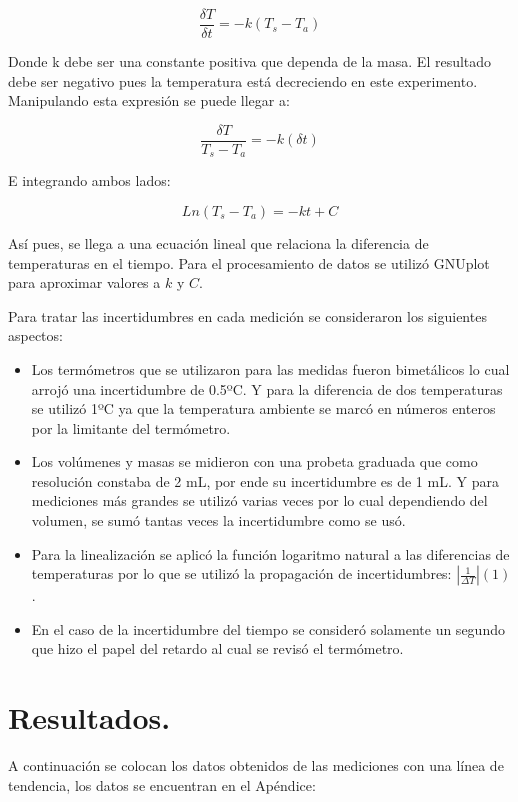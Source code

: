 \documentclass[a4paper]{article}
\begin{document}
$$ \frac{\delta T}{\delta t} = -k(T_{s}-T_{a})$$

Donde k debe ser una constante positiva que dependa de la masa. El resultado debe ser negativo pues la temperatura está decreciendo en este experimento.
Manipulando esta expresión se puede llegar a:

$$\frac{\delta T}{T_{s}-T_{a}}= -k(\delta t)$$

E integrando ambos lados:

$$ Ln(T_{s}-T_{a})=-kt+C $$

Así pues, se llega a una ecuación lineal que relaciona la diferencia de temperaturas en el tiempo. Para el procesamiento de datos se utilizó GNUplot para aproximar valores a $k$ y $C$. 

Para tratar las incertidumbres en cada medición se consideraron los siguientes aspectos:
\begin{itemize}
    \item Los termómetros que se utilizaron para las medidas fueron bimetálicos lo cual arrojó una incertidumbre de 0.5ºC. Y para la diferencia de dos temperaturas se utilizó 1ºC ya que la temperatura ambiente se marcó en números enteros por la limitante del termómetro.
    \item Los volúmenes y masas se midieron con una probeta graduada que como resolución constaba de 2 mL, por ende su incertidumbre es de 1 mL. Y para mediciones más grandes se utilizó varias veces por lo cual dependiendo del volumen, se sumó tantas veces la incertidumbre como se usó.
    \item Para la linealización se aplicó la función logaritmo natural a las diferencias de temperaturas por lo que se utilizó la propagación de incertidumbres: $\left| \frac{1}{\Delta T} \right| (1)$. 
    \item En el caso de la incertidumbre del tiempo se consideró solamente un segundo que hizo el papel del retardo al cual se revisó el termómetro.
\end{itemize}

\section{Resultados.}
A continuación se colocan los datos obtenidos de las mediciones con una línea de tendencia, los datos se encuentran en el Apéndice:
\end{document}
